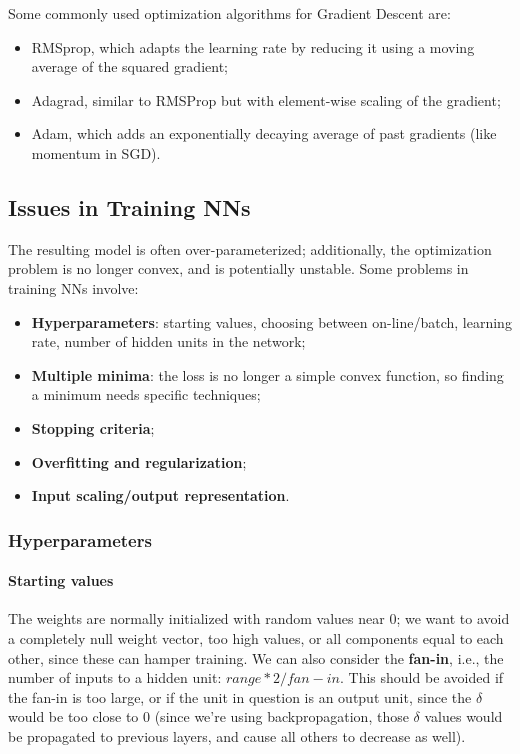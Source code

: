 Some commonly used optimization algorithms for Gradient Descent are:
\begin{itemize}
    \item RMSprop, which adapts the learning rate by reducing it using a moving average of the squared gradient;
    \item Adagrad, similar to RMSProp but with element-wise scaling of the gradient;
    \item Adam, which adds an exponentially decaying average of past gradients (like momentum in SGD).
\end{itemize}

\subsection{Issues in Training NNs}

The resulting model is often over-parameterized; additionally, the optimization problem is no longer convex, and is potentially unstable. Some problems in training NNs involve:
\begin{itemize}
    \item \textbf{Hyperparameters}: starting values, choosing between on-line/batch, learning rate, number of hidden units in the network;

    \item \textbf{Multiple minima}: the loss is no longer a simple convex function, so finding a minimum needs specific techniques;

    \item \textbf{Stopping criteria};

    \item \textbf{Overfitting and regularization};

    \item \textbf{Input scaling/output representation}.
\end{itemize}

\subsubsection{Hyperparameters}

\paragraph{Starting values}

The weights are normally initialized with random values near 0; we want to avoid a completely null weight vector, too high values, or all components equal to each other, since these can hamper training. We can also consider the \textbf{fan-in}, i.e., the number of inputs to a hidden unit: $range * 2 /fan-in$. This should be avoided if the fan-in is too large, or if the unit in question is an output unit, since the $\delta$ would be too close to 0 (since we're using backpropagation, those $\delta$ values would be propagated to previous layers, and cause all others to decrease as well).

